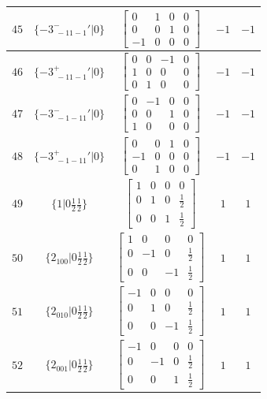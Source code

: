 \documentclass[fleqn,8pt]{jsarticle}
\begin{document}
\begin{longtable}{ccccc}
$ 45 $ & $ \{-3^{-}_{\,\,-11-1}{}'|0\} $ & $ \begin{bmatrix} 0 & 1 & 0 & 0 \\ 0 & 0 & 1 & 0 \\ -1 & 0 & 0 & 0 \end{bmatrix} $ & $ -1 $ & $ -1 $ \\ \hline
$ 46 $ & $ \{-3^{+}_{\,\,-11-1}{}'|0\} $ & $ \begin{bmatrix} 0 & 0 & -1 & 0 \\ 1 & 0 & 0 & 0 \\ 0 & 1 & 0 & 0 \end{bmatrix} $ & $ -1 $ & $ -1 $ \\ \hline
$ 47 $ & $ \{-3^{-}_{\,\,-1-11}{}'|0\} $ & $ \begin{bmatrix} 0 & -1 & 0 & 0 \\ 0 & 0 & 1 & 0 \\ 1 & 0 & 0 & 0 \end{bmatrix} $ & $ -1 $ & $ -1 $ \\ \hline
$ 48 $ & $ \{-3^{+}_{\,\,-1-11}{}'|0\} $ & $ \begin{bmatrix} 0 & 0 & 1 & 0 \\ -1 & 0 & 0 & 0 \\ 0 & 1 & 0 & 0 \end{bmatrix} $ & $ -1 $ & $ -1 $ \\ \hline
$ 49 $ & $ \{1|0 \frac{1}{2} \frac{1}{2}\} $ & $ \begin{bmatrix} 1 & 0 & 0 & 0 \\ 0 & 1 & 0 & \frac{1}{2} \\ 0 & 0 & 1 & \frac{1}{2} \end{bmatrix} $ & $ 1 $ & $ 1 $ \\ \hline
$ 50 $ & $ \{2{}_{100}|0 \frac{1}{2} \frac{1}{2}\} $ & $ \begin{bmatrix} 1 & 0 & 0 & 0 \\ 0 & -1 & 0 & \frac{1}{2} \\ 0 & 0 & -1 & \frac{1}{2} \end{bmatrix} $ & $ 1 $ & $ 1 $ \\ \hline
$ 51 $ & $ \{2{}_{010}|0 \frac{1}{2} \frac{1}{2}\} $ & $ \begin{bmatrix} -1 & 0 & 0 & 0 \\ 0 & 1 & 0 & \frac{1}{2} \\ 0 & 0 & -1 & \frac{1}{2} \end{bmatrix} $ & $ 1 $ & $ 1 $ \\ \hline
$ 52 $ & $ \{2{}_{001}|0 \frac{1}{2} \frac{1}{2}\} $ & $ \begin{bmatrix} -1 & 0 & 0 & 0 \\ 0 & -1 & 0 & \frac{1}{2} \\ 0 & 0 & 1 & \frac{1}{2} \end{bmatrix} $ & $ 1 $ & $ 1 $ \\ \hline

\end{longtable}
\end{document}
